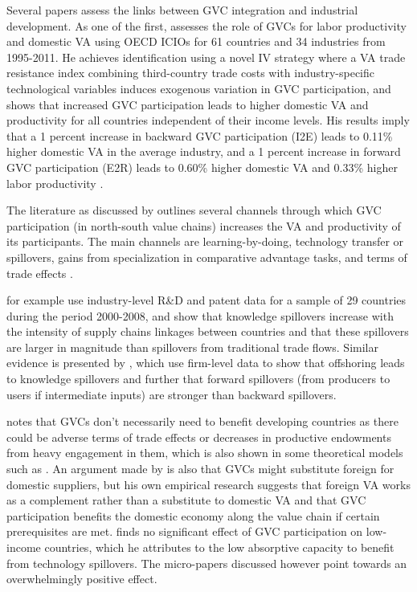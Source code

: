 \documentclass[a4paper]{article}
\begin{document}
Several papers assess the links between GVC integration and industrial development. As one of the first, \citet{Kummritz20161} assesses the role of GVCs for labor productivity and domestic VA using OECD ICIOs for 61 countries and 34 industries from 1995-2011. He achieves identification using a novel IV strategy where a VA trade resistance index combining third-country trade costs with industry-specific technological variables induces exogenous variation in GVC participation, and shows that increased GVC participation leads to higher domestic VA and productivity for all countries independent of their income levels. His results imply that a 1 percent increase in backward GVC participation (I2E) leads to 0.11\% higher domestic VA in the average industry, and a 1 percent increase in forward GVC participation (E2R) leads to 0.60\% higher domestic VA and 0.33\% higher labor productivity \citep{Kummritz20161}. \newline

The literature as discussed by \citet{Kummritz20161} outlines several channels through which GVC participation (in north-south value chains) increases the VA and productivity of its participants. The main channels are learning-by-doing, technology transfer or spillovers, gains from specialization in comparative advantage tasks, and terms of trade effects  \citep{Kummritz20161}. \newline

\citet{piermartini2014knowledge} for example use industry-level R\&D and patent data for a sample of 29 countries during the period 2000-2008, and show that knowledge spillovers increase with the intensity of supply chains linkages between countries and that these spillovers are larger in magnitude than spillovers from traditional trade flows. Similar evidence is presented by \citet{benz2015trade}, which use firm-level data to show that offshoring leads to knowledge spillovers and further that forward spillovers (from producers to users if intermediate inputs) are stronger than backward spillovers. \newline

\citet{Kummritz20161} notes that GVCs don't necessarily need to benefit developing countries as there could be adverse terms of trade effects or decreases in productive endowments from heavy engagement in them, which is also shown in some theoretical models such as \citet{baldwin2014trade}. An argument made by \citet{kummritz2015global} is also that GVCs might substitute foreign for domestic suppliers, but his own empirical research suggests that foreign VA works as a complement rather than a substitute to domestic VA and that GVC participation benefits the domestic economy along the value chain if certain prerequisites are met.  \citet{kummritz2015global} finds no significant effect of GVC participation on low-income countries, which he attributes to the low absorptive capacity to benefit from technology spillovers. The micro-papers discussed however point towards an overwhelmingly positive effect. \newline
\end{document}
